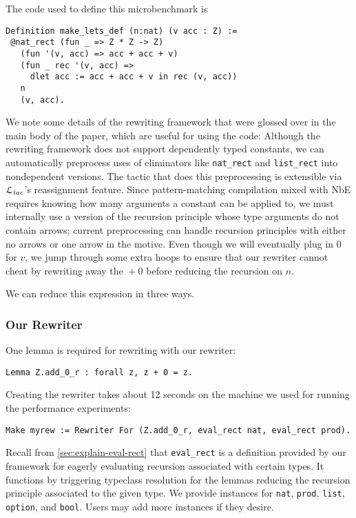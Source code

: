 \documentclass[a4paper,USenglish,cleveref,autoref,thm-restate]{lipics-v2021}
\newcommand{\Ltac}{\ensuremath{\mathcal{L}_\text{\emph{tac}}}}
\begin{document}
\begin{minipage}[t][1cm]{\textwidth}
The code used to define this microbenchmark is
\begin{verbatim}
Definition make_lets_def (n:nat) (v acc : Z) :=
 @nat_rect (fun _ => Z * Z -> Z)
   (fun '(v, acc) => acc + acc + v)
   (fun _ rec '(v, acc) =>
     dlet acc := acc + acc + v in rec (v, acc))
   n
   (v, acc).
\end{verbatim}
We note some details of the rewriting framework that were glossed over in the main body of the paper, which are useful for using the code:
Although the rewriting framework does not support dependently typed constants, we can automatically preprocess uses of eliminators like \texttt{nat_rect} and \texttt{list_rect} into nondependent versions.
The tactic that does this preprocessing is extensible via \Ltac{}'s reassignment feature.
Since pattern-matching compilation mixed with NbE requires knowing how many arguments a constant can be applied to, we must internally use a version of the recursion principle whose type arguments do not contain arrows; current preprocessing can handle recursion principles with either no arrows or one arrow in the motive.
Even though we will eventually plug in 0 for $v$, we jump through some extra hoops to ensure that our rewriter cannot cheat by rewriting away the ${}+0$ before reducing the recursion on $n$.

We can reduce this expression in three ways.

\subsubsection{Our Rewriter}
One lemma is required for rewriting with our rewriter:
\begin{verbatim}
Lemma Z.add_0_r : forall z, z + 0 = z.
\end{verbatim}

Creating the rewriter takes about 12 seconds on the machine we used for running the performance experiments:
\begin{verbatim}
Make myrew := Rewriter For (Z.add_0_r, eval_rect nat, eval_rect prod).
\end{verbatim}
Recall from \autoref{sec:explain-eval-rect} that \texttt{eval_rect} is a definition provided by our framework for eagerly evaluating recursion associated with certain types.
It functions by triggering typeclass resolution for the lemmas reducing the recursion principle associated to the given type.
We provide instances for \texttt{nat}, \texttt{prod}, \texttt{list}, \texttt{option}, and \texttt{bool}.
Users may add more instances if they desire.


\end{minipage}
\end{document}
